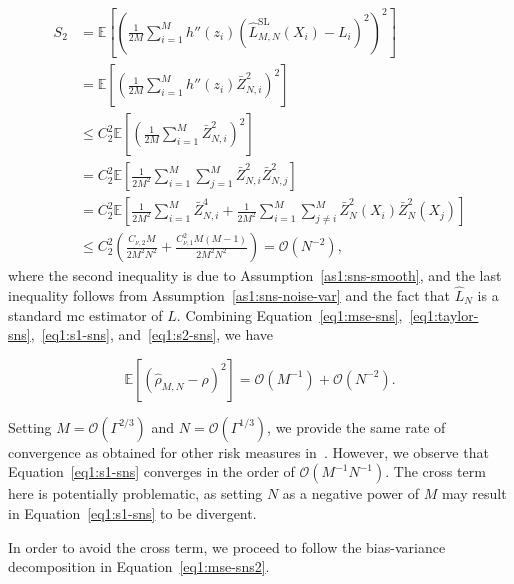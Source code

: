 \begin{align}\label{eq1:s2-sns}
    S_2 & = \mathbb{E} \left[ \left( \frac{1}{2M} \sum_{i=1}^M h''\left( z_i \right) \left( \hat{L}^{\text{SL}}_{M, N}(X_i) - L_i \right)^2 \right)^2\right] \nonumber \\
    & = \mathbb{E} \left[ \left(\frac{1}{2M} \sum_{i=1}^M h''\left( z_i \right) \bar{Z}_{N, i}^2 \right)^2 \right] \nonumber \\
    & \leq C_2^2 \mathbb{E} \left[ \left(\frac{1}{2M} \sum_{i=1}^M \bar{Z}_{N, i}^2 \right)^2 \right] \nonumber \\
    & = C_2^2 \mathbb{E} \left[ \frac{1}{2M^2} \sum_{i=1}^M \sum_{j=1}^M \bar{Z}_{N, i}^2 \bar{Z}_{N, j}^2 \right] \nonumber \\
    & = C_2^2 \mathbb{E} \left[ \frac{1}{2M^2} \sum_{i=1}^M \bar{Z}_{N, i}^4 + \frac{1}{2M^2} \sum_{i=1}^M \sum_{j \neq i}^M \bar{Z}_N^2(X_i) \bar{Z}_N^2(X_j) \right] \nonumber \\
    & \leq  C_2^2 \left(\frac{ C_{\nu, 2} M}{2M^2N^2} + \frac{C_{\nu,1}^2M(M-1)}{2M^2N^2}\right) = \mathcal{O}(N^{-2}),
\end{align}
where the second inequality is due to Assumption~\ref{as1:sns-smooth}, and the last inequality follows from Assumption~\ref{as1:sns-noise-var} and the fact that $\hat{L}_N$ is a standard \gls{mc} estimator of $L$.
Combining Equation~\eqref{eq1:mse-sns},~\ref{eq1:taylor-sns},~\ref{eq1:s1-sns}, and~\ref{eq1:s2-sns}, we have

\begin{equation}\label{eq1:mse-sns-smooth}
    \mathbb{E} \left[ \left( \hat{\rho}_{M, N} - \rho \right)^2 \right] = \mathcal{O}(M^{-1}) + \mathcal{O}(N^{-2}).
\end{equation}

Setting $M = \mathcal{O}(\Gamma^{2/3})$ and $N = \mathcal{O}(\Gamma^{1/3})$, we provide the same rate of convergence as obtained for other risk measures in~\cite{gordy2010nested}.
However, we observe that Equation~\eqref{eq1:s1-sns} converges in the order of $\mathcal{O}(M^{-1}N^{-1})$.
The cross term here is potentially problematic, as setting $N$ as a negative power of $M$ may result in Equation~\eqref{eq1:s1-sns} to be divergent.

In order to avoid the cross term, we proceed to follow the bias-variance decomposition in Equation~\eqref{eq1:mse-sns2}.

